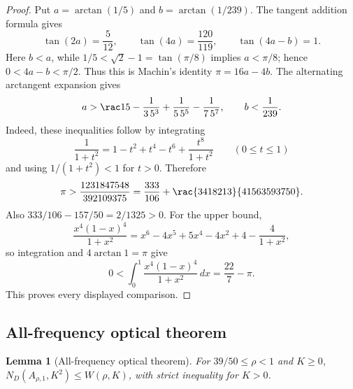 \documentclass[11pt]{article}
\numberwithin{equation}{section}
\newtheorem{lemma}[theorem]{Lemma}
\theoremstyle{definition}
\theoremstyle{remark}
\begin{document}
\begin{proof}
Put \(a=\arctan(1/5)\) and \(b=\arctan(1/239)\).  The tangent addition
formula gives
\[
 \tan(2a)=\frac5{12},\qquad
 \tan(4a)=\frac{120}{119},\qquad
 \tan(4a-b)=1.
\]
Here \(b<a\), while
\(1/5<\sqrt2-1=\tan(\pi/8)\) implies \(a<\pi/8\); hence
\(0<4a-b<\pi/2\).  Thus this is Machin's identity
\(\pi=16a-4b\).  The alternating arctangent expansion gives
\[
 a>\rac15-\frac1{3\,5^3}+\frac1{5\,5^5}-\frac1{7\,5^7},
 \qquad b<\frac1{239}.
\]
Indeed, these inequalities follow by integrating
\[
 \frac1{1+t^2}=1-t^2+t^4-t^6+\frac{t^8}{1+t^2}
 \qquad(0\leq t\leq1)
\]
and using \(1/(1+t^2)<1\) for \(t>0\).
Therefore
\[
 \pi>
 \frac{1231847548}{392109375}
 =\frac{333}{106}+\rac{3418213}{41563593750}.
\]
Also \(333/106-157/50=2/1325>0\).  For the upper bound,
\[
 \frac{x^4(1-x)^4}{1+x^2}
 =x^6-4x^5+5x^4-4x^2+4-\frac4{1+x^2},
\]
so integration and \(4\arctan1=\pi\) give
\[
 0<\int_0^1\frac{x^4(1-x)^4}{1+x^2}\,dx
 =\frac{22}{7}-\pi.
\]
This proves every displayed comparison.
\end{proof}

\subsection{All-frequency optical theorem}

\begin{lemma}[All-frequency optical theorem]
\label{cm:lem-optical}
For \(39/50\leq\rho<1\) and \(K\geq0\),
\(N_D(A_{\rho,1},K^2)\leq W(\rho,K)\), with strict inequality for
\(K>0\).
\end{lemma}
\end{document}

